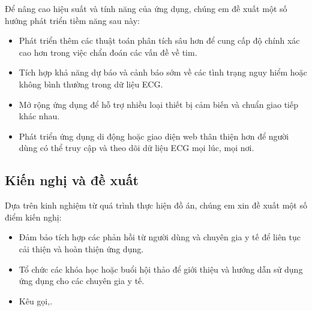 Để nâng cao hiệu suất và tính năng của ứng dụng, chúng em đề xuất một số hướng phát triển tiềm năng sau này:

\begin{adjustwidth}{1.5em}{}
  \begin{itemize}
      \item Phát triển thêm các thuật toán phân tích sâu hơn để cung cấp độ chính xác cao hơn trong việc chẩn đoán các vấn đề về tim.

  
      \item Tích hợp khả năng dự báo và cảnh báo sớm về các tình trạng nguy hiểm hoặc không bình thường trong dữ liệu ECG.

  
      \item Mở rộng ứng dụng để hỗ trợ nhiều loại thiết bị cảm biến và chuẩn giao tiếp khác nhau.

  
      \item  Phát triển ứng dụng di động hoặc giao diện web thân thiện hơn để người dùng có thể truy cập và theo dõi dữ liệu ECG mọi lúc, mọi nơi.

  \end{itemize}
  \end{adjustwidth}


\subsection*{Kiến nghị và đề xuất}


Dựa trên kinh nghiệm từ quá trình thực hiện đồ án, chúng em xin đề xuất một số điểm kiến nghị:

\begin{adjustwidth}{1.5em}{}
  \begin{itemize}
      \item Đảm bảo tích hợp các phản hồi từ người dùng và chuyên gia y tế để liên tục cải thiện và hoàn thiện ứng dụng.

  
      \item Tổ chức các khóa học hoặc buổi hội thảo để giới thiệu và hướng dẫn sử dụng ứng dụng cho các chuyên gia y tế.

  
      \item Kêu gọi,.

    \end{itemize}
  \end{adjustwidth}



\cleardoublepage